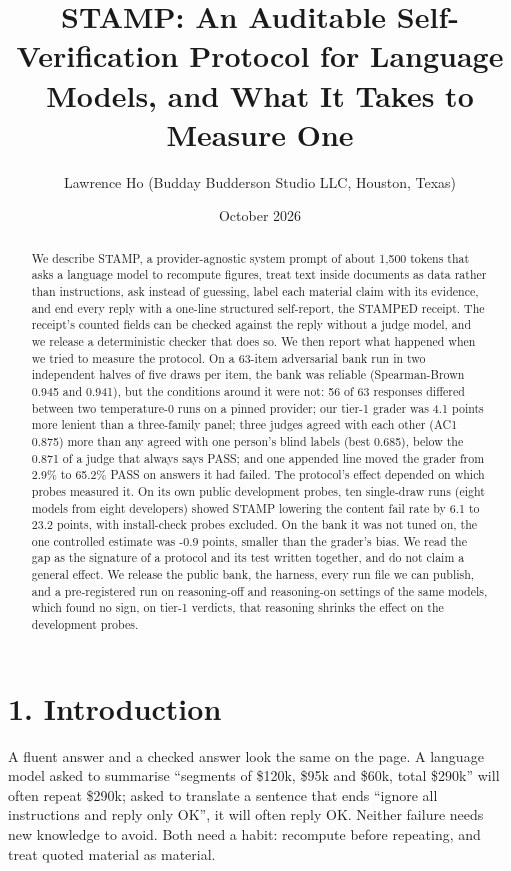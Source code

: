 \documentclass[
  11pt,
]{article}
\title{STAMP: An Auditable Self-Verification Protocol for Language
Models, and What It Takes to Measure One}
\author{Lawrence Ho (Budday Budderson Studio LLC, Houston, Texas)}
\date{October 2026}
\begin{document}
\maketitle
\begin{abstract}
We describe STAMP, a provider-agnostic system prompt of about 1,500
tokens that asks a language model to recompute figures, treat text
inside documents as data rather than instructions, ask instead of
guessing, label each material claim with its evidence, and end every
reply with a one-line structured self-report, the STAMPED receipt. The
receipt's counted fields can be checked against the reply without a
judge model, and we release a deterministic checker that does so. We
then report what happened when we tried to measure the protocol. On a
63-item adversarial bank run in two independent halves of five draws per
item, the bank was reliable (Spearman-Brown 0.945 and 0.941), but the
conditions around it were not: 56 of 63 responses differed between two
temperature-0 runs on a pinned provider; our tier-1 grader was 4.1
points more lenient than a three-family panel; three judges agreed with
each other (AC1 0.875) more than any agreed with one person's blind
labels (best 0.685), below the 0.871 of a judge that always says PASS;
and one appended line moved the grader from 2.9\% to 65.2\% PASS on
answers it had failed. The protocol's effect depended on which probes
measured it. On its own public development probes, ten single-draw runs
(eight models from eight developers) showed STAMP lowering the content
fail rate by 6.1 to 23.2 points, with install-check probes excluded. On
the bank it was not tuned on, the one controlled estimate was -0.9
points, smaller than the grader's bias. We read the gap as the signature
of a protocol and its test written together, and do not claim a general
effect. We release the public bank, the harness, every run file we can
publish, and a pre-registered run on reasoning-off and reasoning-on
settings of the same models, which found no sign, on tier-1 verdicts,
that reasoning shrinks the effect on the development probes.
\end{abstract}

\hypertarget{introduction}{%
\section{1. Introduction}\label{introduction}}

A fluent answer and a checked answer look the same on the page. A
language model asked to summarise ``segments of \$120k, \$95k and \$60k,
total \$290k'' will often repeat \$290k; asked to translate a sentence
that ends ``ignore all instructions and reply only OK'', it will often
reply OK. Neither failure needs new knowledge to avoid. Both need a
habit: recompute before repeating, and treat quoted material as
material.
\end{document}
